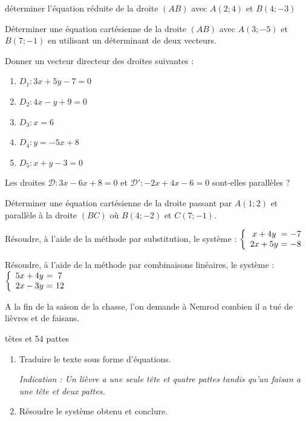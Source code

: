 
\exo 

déterminer l'équation réduite de la droite $(AB)$ avec $A(2 ; 4)$ et $B(4 ; -3)$

\exo

Déterminer une équation cartésienne de la droite $(AB)$ avec $A(3 ; -5)$ et $B(7 ; -1)$ en utilisant un déterminant de deux vecteurs.

\exo 


Donner un vecteur directeur des droites suivantes :

\begin{enumerate}
\item $D_1 : 3x + 5y -7 = 0$ \dotfill
\item $D_2 : 4x -y +9 = 0$ \dotfill
\item $ D_3 : x = 6$ \dotfill
\item $D_4 : y = -5x +8$ \dotfill
\item $D_5 :  x + y -3=0$ \dotfill
\end{enumerate}

\exo 

Les droites $\mathscr{D} : 3x -6x+ 8=0$ et $\mathscr{D'} : -2x + 4x -6=0$ sont-elles parallèles ?


\exo

Déterminer une équation cartésienne de la droite passant par $A(1;2)$ et parallèle à la droite $(BC)$ où $B(4; -2)$ et $C(7; -1)$.

\exo

Résoudre, à l'aide de la méthode par substitution, le système : $\left\lbrace \begin{array}{c@{~=~}c} 
x+4y&-7\\
2x+5y&-8
\end{array}\right. $

\exo

Résoudre, à l'aide de la méthode par combinaisons linéaires, le système : $\left\lbrace \begin{array}{c@{~=~}c} 
5x+4y&7\\
2x-3y&12
\end{array}\right. $

\exo

A la fin de la saison de la chasse, l'on demande à Nemrod combien il a tué de lièvres et de faisans.

 têtes et 54 pattes \fg{} 

\begin{enumerate}
\item Traduire le texte sous forme d'équations.

{\it Indication : Un lièvre a une seule tête et quatre pattes tandis qu'un faisan a une tête et deux pattes.}

\item Résoudre le système obtenu et conclure.
\end{enumerate}

